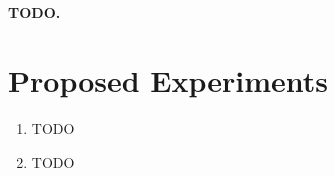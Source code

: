 \documentclass[11pt,a4paper]{article}
\begin{document}

\paragraph{TODO.}

\section{Proposed Experiments}

\begin{enumerate}
  \item TODO
  \item TODO
\end{enumerate}
\end{document}
